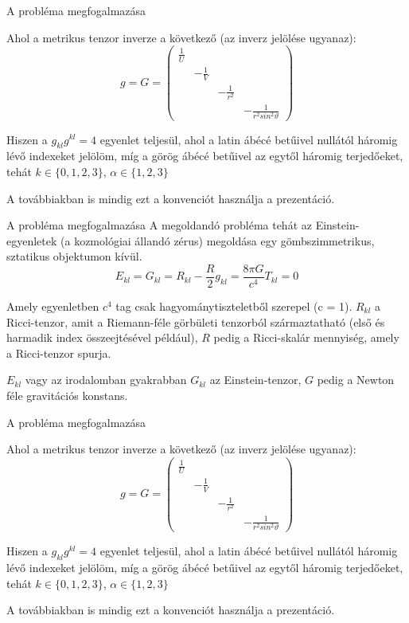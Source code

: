 \documentclass[10pt]{beamer}
\begin{document}
\begin{frame}[t]{A probléma megfogalmazása}
\par Ahol a metrikus  tenzor inverze a következő (az inverz jelölése ugyanaz):
$$
g = G = \begin{pmatrix}
\frac{1}{U}& & &  \\
& -\frac{1}{V}& &  \\
& & -\frac{1}{r^{2}}&  \\
& & & -\frac{1}{r^{2}sin^{2}\vartheta}
\end{pmatrix}
$$
\vspace{4mm}
\par Hiszen a $g_{kl}g^{kl} = 4$ egyenlet teljesül, ahol a latin ábécé betűivel nullától háromig lévő indexeket jelölöm, míg
a görög ábécé betűivel az egytől háromig terjedőeket, tehát $k \in \{0,1,2,3\}$, $\alpha \in \{1,2,3\}$
\vfill
\par A továbbiakban is mindig ezt a konvenciót használja a prezentáció.
\end{frame}

\begin{frame}[t]{A probléma megfogalmazása}
A megoldandó probléma tehát az Einstein-egyenletek (a kozmológiai állandó zérus) megoldása egy gömbszimmetrikus, sztatikus objektumon kívül.
\begin{equation*}
E_{kl} = G_{kl} = R_{kl} - \frac{R}{2}g_{kl} = \frac{8\pi G}{c^{4}}T_{kl} = 0
\end{equation*}
\par Amely egyenletben $c^{4}$ tag csak hagyománytiszteletből szerepel (c = 1). $R_{kl}$ a Ricci-tenzor, amit a Riemann-féle 
görbületi tenzorból származtatható (első és harmadik index összeejtésével például), $R$ pedig a Ricci-skalár mennyiség, amely
a Ricci-tenzor spurja.
\vspace{3mm}
\par $E_{kl}$ vagy az irodalomban gyakrabban $G_{kl}$ az Einstein-tenzor, $G$ pedig a Newton féle gravitációs 
konstans.
\end{frame}

\begin{frame}[t]{A probléma megfogalmazása}
\par Ahol a metrikus  tenzor inverze a következő (az inverz jelölése ugyanaz):
$$
g = G = \begin{pmatrix}
\frac{1}{U}& & &  \\
& -\frac{1}{V}& &  \\
& & -\frac{1}{r^{2}}&  \\
& & & -\frac{1}{r^{2}sin^{2}\vartheta}
\end{pmatrix}
$$
\vspace{4mm}
\par Hiszen a $g_{kl}g^{kl} = 4$ egyenlet teljesül, ahol a latin ábécé betűivel nullától háromig lévő indexeket jelölöm, míg
a görög ábécé betűivel az egytől háromig terjedőeket, tehát $k \in \{0,1,2,3\}$, $\alpha \in \{1,2,3\}$
\vfill
\par A továbbiakban is mindig ezt a konvenciót használja a prezentáció.
\end{frame}
\end{document}
